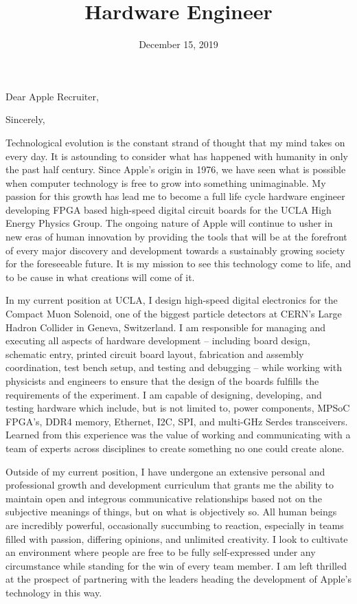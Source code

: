 \documentclass[11pt,a4paper,sans]{moderncv}        %
\title{Hardware Engineer}                               %
\begin{document}
\date{December 15, 2019}
\opening{Dear Apple Recruiter,}
\closing{Sincerely,}
\makelettertitle

Technological evolution is the constant strand of thought that my mind takes on every day. It is astounding to consider what has happened with humanity in only the past half century. Since Apple's origin in 1976, we have seen what is possible when computer technology is free to grow into something unimaginable. My passion for this growth has lead me to become a full life cycle hardware engineer developing FPGA based high-speed digital circuit boards for the UCLA High Energy Physics Group. The ongoing nature of Apple will continue to usher in new eras of human innovation by providing the tools that will be at the forefront of every major discovery and development towards a sustainably growing society for the foreseeable future. It is my mission to see this technology come to life, and to be cause in what creations will come of it.

In my current position at UCLA, I design high-speed digital electronics for the Compact Muon Solenoid, one of the biggest particle detectors at CERN's Large Hadron Collider in Geneva, Switzerland. I am responsible for managing and executing all aspects of hardware development -- including board design, schematic entry, printed circuit board layout, fabrication and assembly coordination, test bench setup, and testing and debugging -- while working with physicists and engineers to ensure that the design of the boards fulfills the requirements of the experiment. I am capable of designing, developing, and testing hardware which include, but is not limited to, power components, MPSoC FPGA's, DDR4 memory, Ethernet, I2C, SPI, and multi-GHz Serdes transceivers. Learned from this experience was the value of working and communicating with a team of experts across disciplines to create something no one could create alone.

Outside of my current position, I have undergone an extensive personal and professional growth and development curriculum that grants me the ability to maintain open and integrous communicative relationships based not on the subjective meanings of things, but on what is objectively so. All human beings are incredibly powerful, occasionally succumbing to reaction, especially in teams filled with passion, differing opinions, and unlimited creativity. I look to cultivate an environment where people are free to be fully self-expressed under any circumstance while standing for the win of every team member. I am left thrilled at the prospect of partnering with the leaders heading the development of Apple's technology in this way.
\end{document}
